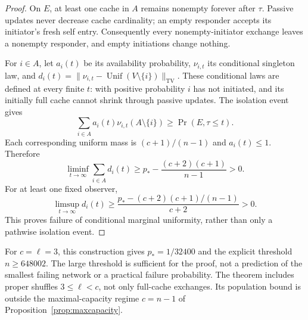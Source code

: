 \documentclass[11pt]{article}
\newcommand{\TV}{\mathrm{TV}}
\newcommand{\Unif}{\operatorname{Unif}}
\begin{document}
\begin{proof}
On $E$, at least one cache in $A$ remains nonempty forever
after $\tau$. Passive updates never decrease cache cardinality;
an empty responder accepts its initiator's fresh self entry.
Consequently every nonempty-initiator exchange leaves a
nonempty responder, and empty initiations change nothing.

For $i\in A$, let $a_i(t)$ be its availability probability,
$\nu_{i,t}$ its conditional singleton law, and
$d_i(t)=\|\nu_{i,t}-\Unif(V\setminus\{i\})\|_{\TV}$.
These conditional laws are defined at every finite $t$:
with positive probability $i$ has not initiated, and its
initially full cache cannot shrink through passive updates.
The isolation event gives
\[
 \sum_{i\in A}a_i(t)\nu_{i,t}(A\setminus\{i\})
 \ge\Pr(E,\tau\le t).
\]
Each corresponding uniform mass is $(c+1)/(n-1)$ and
$a_i(t)\le1$. Therefore
\[
 \liminf_{t\to\infty}\sum_{i\in A}d_i(t)
 \ge p_*-\frac{(c+2)(c+1)}{n-1}>0.
\]
For at least one fixed observer,
\[
 \limsup_{t\to\infty}d_i(t)
 \ge\frac{p_*-(c+2)(c+1)/(n-1)}{c+2}>0.
\]
This proves failure of conditional marginal uniformity,
rather than only a pathwise isolation event.
\end{proof}

For $c=\ell=3$, this construction gives $p_*=1/32400$ and
the explicit threshold $n\ge648002$.
The large threshold is sufficient for the proof, not a
prediction of the smallest failing network or a practical
failure probability. The theorem includes proper shuffles
$3\le\ell<c$, not only full-cache exchanges.
Its population bound is outside the maximal-capacity regime
$c=n-1$ of Proposition~\ref{prop:maxcapacity}.
\end{document}
